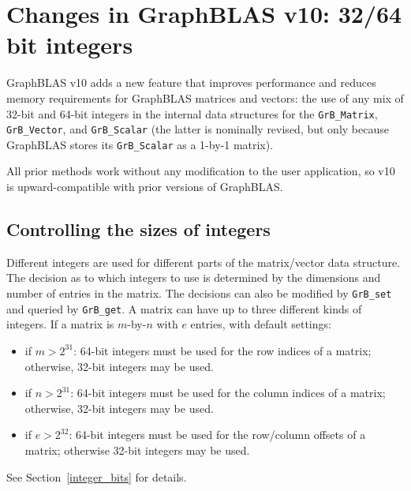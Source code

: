 
\newpage
\section{Changes in GraphBLAS v10: 32/64 bit integers}

GraphBLAS v10 adds a new feature that improves performance and reduces memory
requirements for GraphBLAS matrices and vectors:  the use of any mix of 32-bit
and 64-bit integers in the internal data structures for the \verb'GrB_Matrix',
\verb'GrB_Vector', and \verb'GrB_Scalar' (the latter is nominally revised, but
only because GraphBLAS stores its \verb'GrB_Scalar' as a 1-by-1 matrix).

All prior methods work without any modification to the user application,
so v10 is upward-compatible with prior versions of GraphBLAS.

\subsection{Controlling the sizes of integers}

Different integers are used for different parts of the matrix/vector data
structure.  The decision as to which integers to use is determined by the
dimensions and number of entries in the matrix.  The decisions can also be
modified by \verb'GrB_set' and queried by \verb'GrB_get'.  A matrix can have up
to three different kinds of integers.  If a matrix is $m$-by-$n$ with $e$
entries, with default settings:

\begin{itemize}
\item if $m > 2^{31}$: 64-bit integers must be used for the row indices of a
matrix; otherwise, 32-bit integers may be used.
\item if $n > 2^{31}$: 64-bit integers must be used for the column indices of a
matrix; otherwise, 32-bit integers may be used.
\item if $e > 2^{32}$: 64-bit integers must be used for the row/column offsets of
a matrix; otherwise 32-bit integers may be used.
\end{itemize}

See Section~\ref{integer_bits} for details.

